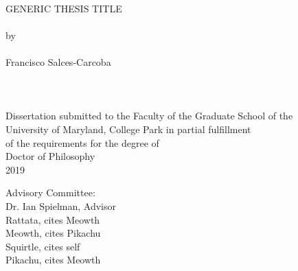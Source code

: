 
\thispagestyle{empty}
\hbox{\ }
\vspace{1in}
\renewcommand{\baselinestretch}{1}
\small\normalsize
\begin{center}

\large{{GENERIC THESIS TITLE}}
\ \\
\ \\
\large{by} \\
\ \\
\large{Francisco Salces-Carcoba}%
\ \\
\ \\
\ \\
\ \\
\normalsize
Dissertation submitted to the Faculty of the Graduate School of the \\
University of Maryland, College Park in partial fulfillment \\
of the requirements for the degree of \\
Doctor of Philosophy \\
2019
\end{center}

\vspace{7.5em}

\noindent Advisory Committee: \\
Dr. Ian Spielman, Advisor \\
Rattata, cites Meowth \\
Meowth, cites Pikachu \\
Squirtle, cites self \\
Pikachu, cites Meowth
